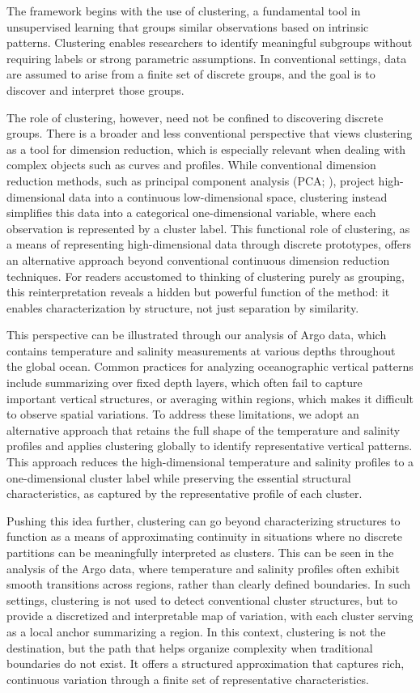 \documentclass[11pt]{article}
\theoremstyle{plain}
\begin{document}
The framework begins with the use of clustering, a fundamental tool in unsupervised learning that groups similar observations based on intrinsic patterns. Clustering enables researchers to identify meaningful subgroups without requiring labels or strong parametric assumptions. In conventional settings, data are assumed to arise from a finite set of discrete groups, and the goal is to discover and interpret those groups.

The role of clustering, however, need not be confined to discovering discrete groups. There is a broader and less conventional perspective that views clustering as a tool for dimension reduction, which is especially relevant when dealing with complex objects such as curves and profiles. While conventional dimension reduction methods, such as principal component analysis (PCA; \citealt{pearson1901liii}), project high-dimensional data into a continuous low-dimensional space, clustering instead simplifies this data into a categorical one-dimensional variable, where each observation is represented by a cluster label. This functional role of clustering, as a means of representing high-dimensional data through discrete prototypes, offers an alternative approach beyond conventional continuous dimension reduction techniques. For readers accustomed to thinking of clustering purely as grouping, this reinterpretation reveals a hidden but powerful function of the method: it enables characterization by structure, not just separation by similarity.

This perspective can be illustrated through our analysis of Argo data, which contains temperature and salinity measurements at various depths throughout the global ocean. Common practices for analyzing oceanographic vertical patterns include summarizing over fixed depth layers, which often fail to capture important vertical structures, or averaging within regions, which makes it difficult to observe spatial variations. To address these limitations, we adopt an alternative approach that retains the full shape of the temperature and salinity profiles and applies clustering globally to identify representative vertical patterns. This approach reduces the high-dimensional temperature and salinity profiles to a one-dimensional cluster label while preserving the essential structural characteristics, as captured by the representative profile of each cluster.

Pushing this idea further, clustering can go beyond characterizing structures to function as a means of approximating continuity in situations where no discrete partitions can be meaningfully interpreted as clusters. This can be seen in the analysis of the Argo data, where temperature and salinity profiles often exhibit smooth transitions across regions, rather than clearly defined boundaries. In such settings, clustering is not used to detect conventional cluster structures, but to provide a discretized and interpretable map of variation, with each cluster serving as a local anchor summarizing a region. In this context, clustering is not the destination, but the path that helps organize complexity when traditional boundaries do not exist. It offers a structured approximation that captures rich, continuous variation through a finite set of representative characteristics.
\end{document}
